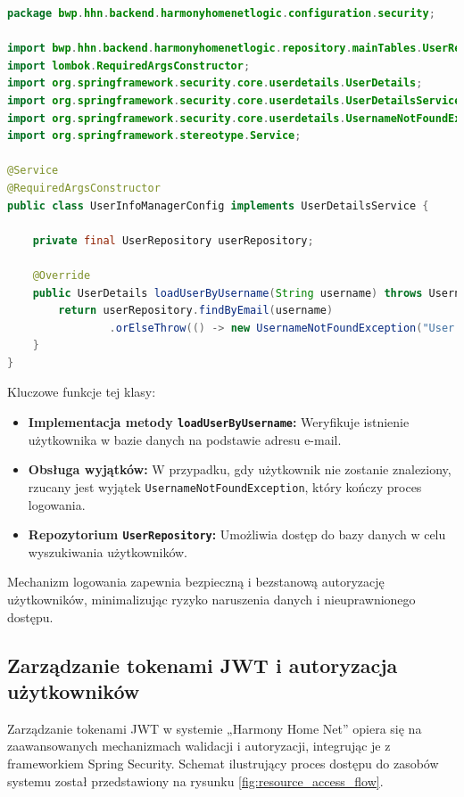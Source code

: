 \begin{lstlisting}[language=Java, caption=Klasa \texttt{UserInfoManagerConfig} odpowiedzialna za zarządzanie użytkownikami]
package bwp.hhn.backend.harmonyhomenetlogic.configuration.security;

import bwp.hhn.backend.harmonyhomenetlogic.repository.mainTables.UserRepository;
import lombok.RequiredArgsConstructor;
import org.springframework.security.core.userdetails.UserDetails;
import org.springframework.security.core.userdetails.UserDetailsService;
import org.springframework.security.core.userdetails.UsernameNotFoundException;
import org.springframework.stereotype.Service;

@Service
@RequiredArgsConstructor
public class UserInfoManagerConfig implements UserDetailsService {

    private final UserRepository userRepository;

    @Override
    public UserDetails loadUserByUsername(String username) throws UsernameNotFoundException {
        return userRepository.findByEmail(username)
                .orElseThrow(() -> new UsernameNotFoundException("User not found"));
    }
}
\end{lstlisting}

Kluczowe funkcje tej klasy:
\begin{itemize}
    \item \textbf{Implementacja metody \texttt{loadUserByUsername}:} Weryfikuje istnienie użytkownika w bazie danych na podstawie adresu e-mail.
    \item \textbf{Obsługa wyjątków:} W przypadku, gdy użytkownik nie zostanie znaleziony, rzucany jest wyjątek \texttt{UsernameNotFoundException}, który kończy proces logowania.
    \item \textbf{Repozytorium \texttt{UserRepository}:} Umożliwia dostęp do bazy danych w celu wyszukiwania użytkowników.
\end{itemize}

Mechanizm logowania zapewnia bezpieczną i bezstanową autoryzację użytkowników, minimalizując ryzyko naruszenia danych i nieuprawnionego dostępu.

\subsection{Zarządzanie tokenami JWT i autoryzacja użytkowników}

Zarządzanie tokenami JWT w systemie „Harmony Home Net” opiera się na zaawansowanych mechanizmach walidacji i autoryzacji, integrując je z frameworkiem Spring Security. Schemat ilustrujący proces dostępu do zasobów systemu został przedstawiony na rysunku \ref{fig:resource_access_flow}.

